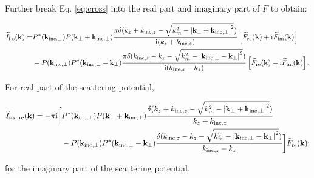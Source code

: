 \documentclass{mynotes}
\begin{document}
Further break Eq. \ref{eq:cross} into the real part and imaginary part of $F$ to obtain:

\begin{equation}
	\begin{aligned}
		\widetilde{I}_{\text{i-s}}(\mathbf{k})
		= & P^*(\mathbf{k_{\text{inc}, \perp}})P(\mathbf{k}_{\perp}+\mathbf{k}_{\text{inc}, \perp})
		\frac{\pi \delta(k_z + k_{\text{inc}, z} - \sqrt{k_m^2 - \abs{\mathbf{k}_{\perp}+\mathbf{k}_{\text{inc}, \perp}}^2})}
		{\mathrm{i} (k_z+k_{\text{inc},z})}
		\left[\widetilde{F}_{\text{re}}(\mathbf{k}) + \mathrm{i}\widetilde{F}_{\text{im}}(\mathbf{k})\right]  \\
		  & -P(\mathbf{k_{\text{inc}, \perp}})P^*(\mathbf{k_{\text{inc}, \perp}}-\mathbf{k_{\perp}})
		\frac{\pi \delta(k_{\text{inc}, z} - k_z - \sqrt{k_m^2 - \abs{\mathbf{k}_{\text{inc}, \perp}-\mathbf{k}_{\perp}}^2})}
		{\mathrm{i} (k_{\text{inc}, z} - k_z)}
		\left[\widetilde{F}_{\text{re}}(\mathbf{k}) - \mathrm{i}\widetilde{F}_{\text{im}}(\mathbf{k})\right]. \\
	\end{aligned}
\end{equation}

For real part of the scattering potential,

\begin{equation}
	\begin{aligned}
		\widetilde{I}_{\text{i-s, re}}(\mathbf{k})
		= -\pi \mathrm{i}
		\bigg[
		 & P^*(\mathbf{k_{\text{inc}, \perp}})P(\mathbf{k}_{\perp}+\mathbf{k}_{\text{inc}, \perp})
			\frac{\delta(k_z + k_{\text{inc}, z} - \sqrt{k_m^2 - \abs{\mathbf{k}_{\perp}+\mathbf{k}_{\text{inc}, \perp}}^2})}
		{k_z+k_{\text{inc},z}}                                                                      \\
		 & -P(\mathbf{k_{\text{inc}, \perp}})P^*(\mathbf{k_{\text{inc}, \perp}}-\mathbf{k_{\perp}})
			\frac{\delta(k_{\text{inc}, z} - k_z - \sqrt{k_m^2 - \abs{\mathbf{k}_{\text{inc}, \perp}-\mathbf{k}_{\perp}}^2})}
			{k_{\text{inc}, z} - k_z}
		\bigg] \widetilde{F}_{\text{re}}(\mathbf{k});                                               \\
	\end{aligned}
\end{equation}

for the imaginary part of the scattering potential,
\end{document}
